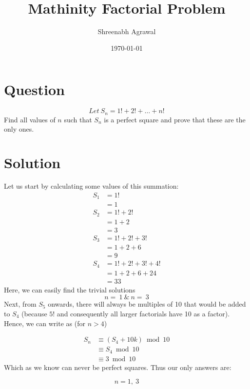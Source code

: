 \documentclass{article}
\title{Mathinity Factorial Problem}
\author{Shreenabh Agrawal}
\date{\today}
\begin{document}
\maketitle

\section{Question}
$$Let \: S_{n}=1 !+2 !+\ldots+n !$$
Find all values of $n$ such that $S_{n}$ is a perfect square and prove that these are the only ones.
\section{Solution}
Let us start by calculating some values of this summation:
$$\begin{aligned}
S_{1} &=1 ! \\
&=1 \\
S_{2} &=1 !+2 ! \\
&=1+2 \\
&=3 \\
S_{3} &=1 !+2 !+3 ! \\
&=1+2+6 \\
&=9 \\
S_{4} &=1 !+2 !+3 !+4 !\\
&=1+2+6+24 \\
&=33 
\end{aligned}$$
Here, we can easily find the trivial solutions $$n = \: 1 \: \& \: n = \: 3$$
Next, from $S_5$ onwards, there will always be multiples of 10 that would be added to $S_4$ (because $5!$ and consequently all larger factorials have 10 as a factor). Hence, we can write as (for $n > 4$)

$$\begin{aligned}
S_{n} & \equiv\left(S_{4}+10 k\right) \bmod 10 \\
& \equiv S_{4} \bmod 10 \\
& \equiv 3 \bmod 10
\end{aligned}$$
Which as we know can never be perfect squares. Thus our only answers are:

$$\boxed{n = 1, \: 3}$$
\end{document}
